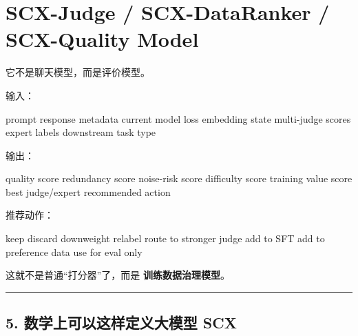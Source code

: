\documentclass[
  12pt,
]{ctexart}
\newenvironment{Shaded}{}{}
\newcommand{\NormalTok}[1]{#1}
\begin{document}
\section{\texorpdfstring{\textbf{SCX-Judge / SCX-DataRanker /
SCX-Quality
Model}}{SCX-Judge / SCX-DataRanker / SCX-Quality Model}}\label{scx-judge-scx-dataranker-scx-quality-model}

它不是聊天模型，而是评价模型。

输入：

\begin{Shaded}
\begin{Highlighting}[]
\NormalTok{prompt}
\NormalTok{response}
\NormalTok{metadata}
\NormalTok{current model loss}
\NormalTok{embedding state}
\NormalTok{multi{-}judge scores}
\NormalTok{expert labels}
\NormalTok{downstream task type}
\end{Highlighting}
\end{Shaded}

输出：

\begin{Shaded}
\begin{Highlighting}[]
\NormalTok{quality score}
\NormalTok{redundancy score}
\NormalTok{noise{-}risk score}
\NormalTok{difficulty score}
\NormalTok{training value score}
\NormalTok{best judge/expert}
\NormalTok{recommended action}
\end{Highlighting}
\end{Shaded}

推荐动作：

\begin{Shaded}
\begin{Highlighting}[]
\NormalTok{keep}
\NormalTok{discard}
\NormalTok{downweight}
\NormalTok{relabel}
\NormalTok{route to stronger judge}
\NormalTok{add to SFT}
\NormalTok{add to preference data}
\NormalTok{use for eval only}
\end{Highlighting}
\end{Shaded}

这就不是普通``打分器''了，而是 \textbf{训练数据治理模型}。

\begin{center}\rule{0.5\linewidth}{0.5pt}\end{center}

\subsection{5. 数学上可以这样定义大模型
SCX}\label{ux6570ux5b66ux4e0aux53efux4ee5ux8fd9ux6837ux5b9aux4e49ux5927ux6a21ux578b-scx}
\end{document}

